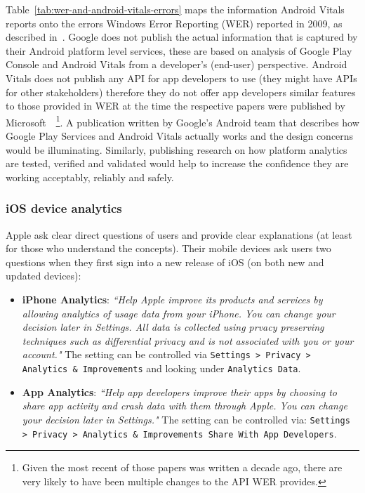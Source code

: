 Table~\ref{tab:wer-and-android-vitals-errors} maps the information Android Vitals reports onto the errors Windows Error Reporting (WER) reported in 2009, as described in~\citep{kinshuman2009_debugging_in_the_very_large}. Google does not publish the actual information that is captured by their Android platform level services, these are based on analysis of Google Play Console and Android Vitals from a developer's (end-user) perspective. Android Vitals does not publish any API for app developers to use (they might have APIs for other stakeholders) therefore they do not offer app developers similar features to those provided in WER at the time the respective papers were published by Microsoft~\citep{kinshuman2009_debugging_in_the_very_large, kinshuman2011_debugging_in_the_very_large}~\footnote{Given the most recent of those papers was written a decade ago, there are very likely to have been multiple changes to the API WER provides.}. A publication written by Google's Android team that describes how Google Play Services and Android Vitals actually works and the design concerns would be illuminating. Similarly, publishing research on how platform analytics are tested, verified and validated would help to increase the confidence they are working acceptably, reliably and safely.

\subsubsection{iOS device analytics}
Apple ask clear direct questions of users and provide clear explanations (at least for those who understand the concepts). Their mobile devices ask users two questions when they first sign into a new release of iOS (on both new and updated devices):
\begin{itemize}
    \item \textbf{iPhone Analytics}: \emph{``Help Apple improve its products and services by allowing analytics of usage data from your iPhone. You can change your decision later in Settings. All data is collected using prvacy preserving techniques such as differential privacy and is not associated with you or your account."} The setting can be controlled via \texttt{Settings > Privacy > Analytics \& Improvements} and looking under \texttt{Analytics Data}.
    \item \textbf{App Analytics}: \emph{``Help app developers improve their apps by choosing to share app activity and crash data with them through Apple. You can change your decision later in Settings."} The setting can be controlled via: \texttt{Settings > Privacy > Analytics \& Improvements Share With App Developers}.
\end{itemize}


